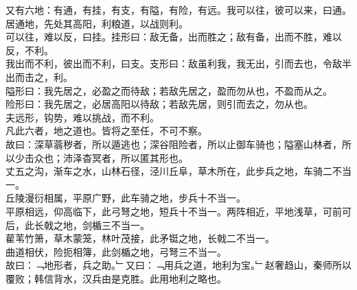 又有六地：有通，有挂，有支，有隘，有险，有远。我可以往，彼可以来，曰通。居通地，先处其高阳，利粮道，以战则利。\\
可以往，难以反，曰挂。挂形曰：敌无备，出而胜之；敌有备，出而不胜，难以反，不利。\\
我出而不利，彼出而不利，曰支。支形曰：敌虽利我，我无出，引而去也，令敌半出而击之，利。\\
隘形曰：我先居之，必盈之而待敌；若敌先居之，盈而勿从也，不盈而从之。\\
险形曰：我先居之，必居高阳以待敌；若敌先居，则引而去之，勿从也。\\
夫远形，钩势，难以挑战，而不利。\\
凡此六者，地之道也。皆将之至任，不可不察。\\
故曰：深草蓊秽者，所以遁逃也；深谷阻险者，所以止御车骑也；隘塞山林者，所以少击众也；沛泽杳冥者，所以匿其形也。\\
丈五之沟，渐车之水，山林石径，泾川丘阜，草木所在，此步兵之地，车骑二不当一。\\
丘陵漫衍相属，平原广野，此车骑之地，步兵十不当一。\\
平原相远，仰高临下，此弓弩之地，短兵十不当一。两阵相近，平地浅草，可前可后，此长戟之地，剑楯三不当一。\\
雚苇竹箫，草木蒙笼，林叶茂接，此矛铤之地，长戟二不当一。\\
曲道相伏，险扼相簿，此剑楯之地，弓弩三不当一。\\
故曰：﹁地形者，兵之助。﹂又曰：﹁用兵之道，地利为宝。﹂赵奢趋山，秦师所以覆败；韩信背水，汉兵由是克胜。此用地利之略也。
%
%
